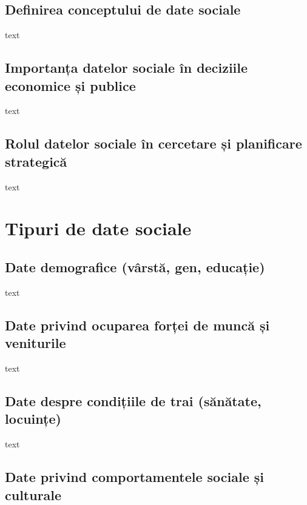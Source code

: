 \documentclass[
  11pt,
  b5paper,
  nottoc]{book}
\begin{document}
\subsection{Definirea conceptului de date
sociale}\label{definirea-conceptului-de-date-sociale}

text

\subsection{Importanța datelor sociale în deciziile economice și
publice}\label{importanux21ba-datelor-sociale-uxeen-deciziile-economice-ux219i-publice}

text

\subsection{Rolul datelor sociale în cercetare și planificare
strategică}\label{rolul-datelor-sociale-uxeen-cercetare-ux219i-planificare-strategicux103}

text

\section{Tipuri de date sociale}\label{tipuri-de-date-sociale}

\subsection{Date demografice (vârstă, gen,
educație)}\label{date-demografice-vuxe2rstux103-gen-educaux21bie}

text

\subsection{Date privind ocuparea forței de muncă și
veniturile}\label{date-privind-ocuparea-forux21bei-de-muncux103-ux219i-veniturile}

text

\subsection{Date despre condițiile de trai (sănătate,
locuințe)}\label{date-despre-condiux21biile-de-trai-sux103nux103tate-locuinux21be}

text

\subsection{Date privind comportamentele sociale și
culturale}\label{date-privind-comportamentele-sociale-ux219i-culturale}
\end{document}
